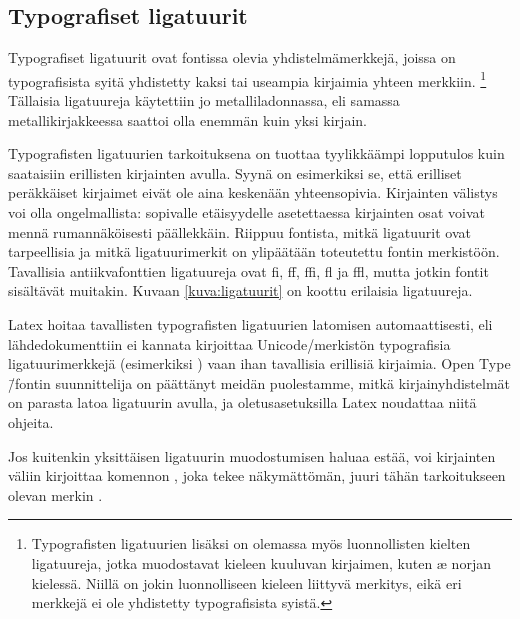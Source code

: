 \subsection{Typografiset ligatuurit}

Typografiset ligatuurit ovat fontissa olevia yhdistelmämerkkejä, joissa
on typografisista syitä yhdistetty kaksi tai useampia kirjaimia yhteen
merkkiin.%
\footnote{Typografisten ligatuurien lisäksi on olemassa myös
  luonnollisten kielten ligatuureja, jotka muodostavat kieleen kuuluvan
  kirjaimen, kuten æ norjan kielessä. Niillä on jokin luonnolliseen
  kieleen liittyvä merkitys, eikä eri merkkejä ei ole yhdistetty
  typografisista syistä.} Tällaisia ligatuureja käytettiin jo
metalliladonnassa, eli samassa metallikirjakkeessa saattoi olla enemmän
kuin yksi kirjain.

Typografisten ligatuurien tarkoituksena on tuottaa tyylikkäämpi
lopputulos kuin saataisiin erillisten kirjainten avulla. Syynä on
esimerkiksi se, että erilliset peräkkäiset kirjaimet eivät ole aina
keskenään yhteensopivia. Kirjainten välistys voi olla ongelmallista:
sopivalle etäisyydelle asetettaessa kirjainten osat voivat mennä
rumannäköisesti päällekkäin. Riippuu fontista, mitkä ligatuurit ovat
tarpeellisia ja mitkä ligatuurimerkit on ylipäätään toteutettu fontin
merkistöön. Tavallisia antiikvafonttien ligatuureja ovat fi, ff, ffi, fl
ja ffl, mutta jotkin fontit sisältävät muitakin. Kuvaan
\ref{kuva:ligatuurit} on koottu erilaisia ligatuureja.


Latex hoitaa tavallisten typografisten ligatuurien latomisen
automaattisesti, eli lähdedokumenttiin ei kannata kirjoittaa
Unicode\-/merkistön typografisia ligatuurimerkkejä (esimerkiksi
) vaan ihan tavallisia
erillisiä kirjaimia. Open Type \=/fontin suunnittelija on päättänyt
meidän puolestamme, mitkä kir\-jain\-yh\-dis\-tel\-mät on parasta latoa
ligatuurin avulla, ja ole\-tus\-ase\-tuk\-sil\-la Latex noudattaa niitä
ohjeita.

Jos kuitenkin yksittäisen ligatuurin muodostumisen haluaa estää, voi
kirjainten väliin kirjoittaa komennon , joka tekee näkymättömän, juuri tähän
tarkoitukseen olevan merkin .

